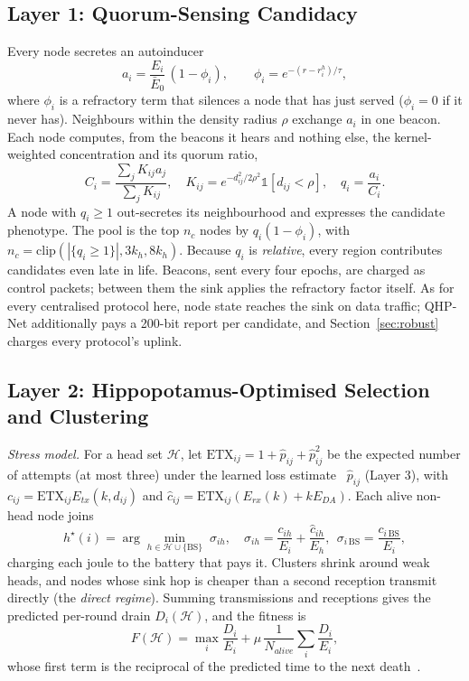 \subsection{Layer 1: Quorum-Sensing Candidacy}
Every node secretes an autoinducer~\cite{miller2001quorum}
\begin{equation}
a_i=\frac{E_i}{\bar E_0}\,(1-\phi_i),\qquad \phi_i=e^{-(r-r_i^h)/\tau},
\label{eq:secretion}
\end{equation}
where $\phi_i$ is a refractory term that silences a node that has just served ($\phi_i=0$ if it never has). Neighbours within the density radius $\rho$ exchange $a_i$ in one beacon. Each node computes, from the beacons it hears and nothing else, the kernel-weighted concentration and its quorum ratio,
\begin{equation}
C_i=\frac{\sum_j K_{ij}a_j}{\sum_j K_{ij}},\quad K_{ij}=e^{-d_{ij}^2/2\rho^2}\mathbb 1[d_{ij}<\rho],\quad q_i=\frac{a_i}{C_i}.
\label{eq:quorum}
\end{equation}
A node with $q_i\ge1$ out-secretes its neighbourhood and expresses the candidate phenotype. The pool is the top $n_c$ nodes by $q_i(1-\phi_i)$, with $n_c=\text{clip}(|\{q_i\ge1\}|,3k_h,8k_h)$. Because $q_i$ is \emph{relative}, every region contributes candidates even late in life. Beacons, sent every four epochs, are charged as control packets; between them the sink applies the refractory factor itself. As for every centralised protocol here, node state reaches the sink on data traffic; QHP-Net additionally pays a 200-bit report per candidate, and Section~\ref{sec:robust} charges every protocol's uplink.

\subsection{Layer 2: Hippopotamus-Optimised Selection and Clustering}
\emph{Stress model.} For a head set $\mathcal H$, let $\text{ETX}_{ij}=1+\hat p_{ij}+\hat p_{ij}^2$ be the expected number of attempts (at most three) under the learned loss estimate~\cite{decouto2003etx} $\hat p_{ij}$ (Layer 3), with $c_{ij}=\text{ETX}_{ij}E_{tx}(k,d_{ij})$ and $\hat c_{ij}=\text{ETX}_{ij}(E_{rx}(k)+kE_{DA})$. Each alive non-head node joins
\begin{equation}
h^\star(i)=\arg\min_{h\in\mathcal H\cup\{\text{BS}\}}\;\sigma_{ih},\quad \sigma_{ih}=\frac{c_{ih}}{E_i}+\frac{\hat c_{ih}}{E_h},\ \ \sigma_{i\,\text{BS}}=\frac{c_{i\,\text{BS}}}{E_i},
\label{eq:join}
\end{equation}
charging each joule to the battery that pays it. Clusters shrink around weak heads, and nodes whose sink hop is cheaper than a second reception transmit directly (the \emph{direct regime}). Summing transmissions and receptions gives the predicted per-round drain $D_i(\mathcal H)$, and the fitness is
\begin{equation}
F(\mathcal H)=\max_i\frac{D_i}{E_i}+\mu\,\frac{1}{N_{alive}}\sum_i\frac{D_i}{E_i},
\label{eq:fitness}
\end{equation}
whose first term is the reciprocal of the predicted time to the next death~\cite{chang2004maxlife}.

